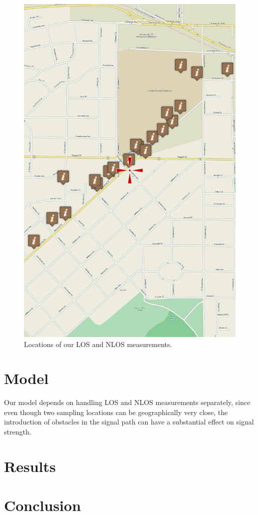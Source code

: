 \documentclass[12pt]{article}
\begin{document}
\begin{figure}[t]
\center
\includegraphics[width=.5\linewidth]{locations}
\caption{Locations of our LOS and NLOS measurements.}
\label{fig:locations}
\end{figure}

\section{Model}
Our model depends on handling LOS and NLOS measurements separately, since even
though two sampling locations can be geographically very close, the introduction
of obstacles in the signal path can have a substantial effect on signal
strength.

\section{Results}
\section{Conclusion}

%
%
\end{document}
